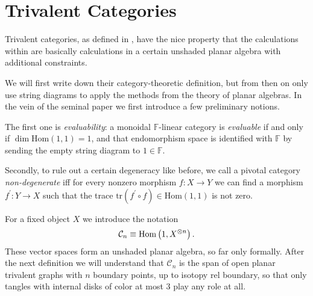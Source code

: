 \section{Trivalent Categories}
Trivalent categories, as defined in \cite{Morrison2017Trivalent}, have the nice property that the calculations within are basically calculations in a certain unshaded planar algebra with additional constraints.

We will first write down their category-theoretic definition, but from then on only use string diagrams to apply the methods from the theory of planar algebras. In the vein of the seminal paper we first introduce a few preliminary notions.

The first one is \emph{evaluability}: a monoidal $\mathbb{F}$-linear category is \emph{evaluable} if and only if $\dim\mathrm{Hom}(1,1) = 1$, and that endomorphism space is identified with $\mathbb{F}$ by sending the empty string diagram to $1\in \mathbb{F}$.

Secondly, to rule out a certain degeneracy like before, we call a pivotal category \emph{non-degenerate} iff for every nonzero morphism $f:X\rightarrow Y$ we can find a morphism $f^\prime:Y\rightarrow X$ such that the trace $\mathrm{tr}\left( f^\prime\circ f \right)\in\mathrm{Hom}(1,1)$ is not zero.

For a fixed object $X$ we introduce the notation 
\begin{align*}
\mathcal{C}_n \equiv\mathrm{Hom}\left( 1, X^{\otimes n} \right).
\end{align*}
These vector spaces form an unshaded planar algebra, so far only formally. After the next definition we will understand that $\mathcal{C}_n$ is the span of open planar trivalent graphs with $n$ boundary points, up to isotopy rel boundary, so that only tangles with internal disks of color at most $3$ play any role at all.

